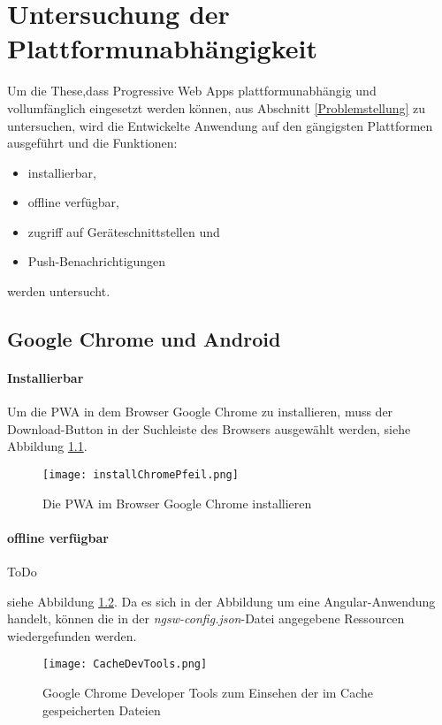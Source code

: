 \chapter{Untersuchung der Plattformunabhängigkeit}

Um die These,dass Progressive Web Apps plattformunabhängig und vollumfänglich eingesetzt werden können, aus Abschnitt \ref{Problemstellung} zu untersuchen, wird die Entwickelte Anwendung auf den gängigsten Plattformen ausgeführt und die Funktionen:
\begin{itemize}
    \item installierbar,
    \item offline verfügbar,
    \item zugriff auf Geräteschnittstellen und
    \item Push-Benachrichtigungen
\end{itemize} 
werden untersucht. 

\section{Google Chrome und Android}

\subsubsection*{Installierbar}

Um die PWA in dem Browser Google Chrome zu installieren, muss der Download-Button in der Suchleiste des Browsers ausgewählt werden, siehe Abbildung \ref{installChrome}.

\begin{figure}[!htb]
    \centering
    \texttt{[image: installChromePfeil.png]}
    \caption{Die PWA im Browser Google Chrome installieren}
    \label{installChrome}
\end{figure}

\subsubsection{offline verfügbar}
ToDo 

siehe Abbildung \ref{img:CacheDevTools}. Da es sich in der Abbildung um eine Angular-Anwendung handelt, können die in der \textit{ngsw-config.json}-Datei angegebene Ressourcen wiedergefunden werden.   

\begin{figure}[!htb]
    \centering
    \texttt{[image: CacheDevTools.png]}
    \caption{Google Chrome Developer Tools zum Einsehen der im Cache gespeicherten Dateien}
    \label{img:CacheDevTools}
\end{figure}



